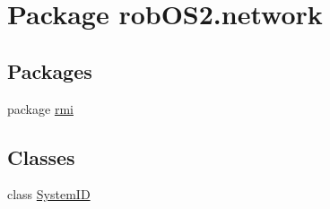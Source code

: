 \hypertarget{namespacerob_o_s2_1_1network}{
\section{Package robOS2.network}
\label{namespacerob_o_s2_1_1network}
}
\subsection*{Packages}
\begin{DoxyCompactItemize}
\item 
package \hyperlink{namespacerob_o_s2_1_1network_1_1rmi}{rmi}
\end{DoxyCompactItemize}
\subsection*{Classes}
\begin{DoxyCompactItemize}
\item 
class \hyperlink{classrob_o_s2_1_1network_1_1_system_i_d}{SystemID}
\end{DoxyCompactItemize}
